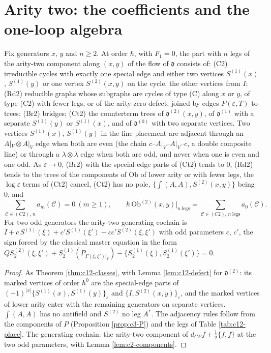 \section{Arity two: the coefficients and the one-loop algebra}

\begin{proposition}
\label{prop:c12-classes2}
Fix generators $x$, $y$ and $n\ge2$. At order $\hbar$, with $F_1=0$, the part with $n$ legs of the arity-two component along $(x,y)$ of the flow of $\mathfrak d$ consists of: (C2) irreducible cycles with exactly one special edge and either two vertices $S^{(1)}(x)$, $S^{(1)}(y)$ or one vertex $S^{(2)}(x,y)$ on the cycle, the other vertices from $I$; (Rd2) reducible graphs whose subgraphs are cycles of type (C) along $x$ or $y$, of type (C2) with fewer legs, or of the arity-zero defect, joined by edges $P(\varepsilon,T)$ to trees; (Br2) bridges; (Ct2) the counterterm trees of $\mathfrak d^{(2)}(x,y)$, of $\mathfrak d^{(1)}$ with a separate $S^{(1)}(y)$ or $S^{(1)}(x)$, and of $\mathfrak d^{(0)}$ with two separate vertices. Two vertices $S^{(1)}(x)$, $S^{(1)}(y)$ in the line placement are adjacent through an $A|_V\otimes A|_V$ edge when both are even (the chain $c$--$A|_V$--$A|_V$--$c$, a double composite line) or through a $\lambda\otimes\lambda$ edge when both are odd, and never when one is even and one odd. As $\varepsilon\to0$, (Br2) with the special-edge parts of (Ct2) tends to $0$, (Rd2) tends to the trees of the components of $\mathrm{Ob}$ of lower arity or with fewer legs, the $\log\varepsilon$ terms of (Ct2) cancel, (Ct2) has no pole, $\{\int(A,A),S^{(2)}(x,y)\}$ being $0$, and
\begin{equation}
\sum_{\mathcal C\in(C2),\,n}a_m(\mathcal C)=0\ (m\ge1),\qquad \hbar\,\mathrm{Ob}^{(2)}(x,y)\big|_{n\ \text{legs}}=\sum_{\mathcal C\in(C2),\,n\ \text{legs}}a_0(\mathcal C).
\label{eq:c12-local2}
\end{equation}
For two odd generators the arity-two generating cochain is $I+c\,S^{(1)}(\xi)+c'S^{(1)}(\xi')-cc'S^{(2)}(\xi,\xi')$ with odd parameters $c$, $c'$, the sign forced by the classical master equation in the form $QS^{(2)}_2(\xi,\xi')+S^{(1)}_2(P_{\Gamma(\xi,\xi')|_V})-\{S^{(1)}_2(\xi),S^{(1)}_2(\xi')\}=0$.
\end{proposition}

\begin{proof}
As Theorem \ref{thm:c12-classes}, with Lemma \ref{lem:c12-defect} for $\mathfrak d^{(2)}$: its marked vertices of order $\hbar^0$ are the special-edge parts of $(-1)^{|x|}\{S^{(1)}(x),S^{(1)}(y)\}_\varepsilon$ and $\{I,S^{(2)}(x,y)\}_\varepsilon$, and the marked vertices of lower arity enter with the remaining generators on separate vertices. $\int(A,A)$ has no antifield and $S^{(2)}$ no leg $A^*$. The adjacency rules follow from the components of $P$ (Proposition \ref{prop:c3-P}) and the legs of Table \ref{tab:c12-place}. The generating cochain: the arity-two component of $d_{CE}f+\tfrac12\{f,f\}$ at the two odd parameters, with Lemma \ref{lem:c2-components}.
\end{proof}

